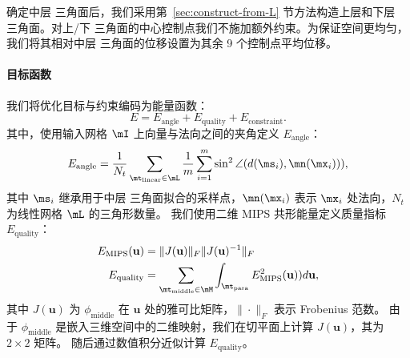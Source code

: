 %
确定中层 \Bezier 三角面后，我们采用第~\ref{sec:construct-from-L} 节方法构造上层和下层 \Bezier 三角面。对上/下 \Bezier 三角面的中心控制点我们不施加额外约束。为保证空间更均匀，我们将其相对中层 \Bezier 三角面的位移设置为其余 9 个控制点平均位移。

\paragraph{目标函数}
我们将优化目标与约束编码为能量函数：
\begin{equation}\label{equ:enenrgy}
	E = E_{\text{angle}} + E_{\text{quality}} + E_\text{constraint}.
\end{equation}
其中，使用输入网格 $\mI$ 上向量与法向之间的夹角定义 $E_{\text{angle}}$：
\begin{equation}\label{equ:angle}
 E_{\text{angle}} = \frac{1}{N_t} \sum_{\mt_{\text{linear}} \in \mL} \frac{1}{m} \sum_{i=1}^{m} \sin^2 \angle (d(\ms_i), \mn(\mx_i))),
\end{equation}
其中 $\ms_i$ 继承用于中层 \Bezier 三角面拟合的采样点，$\mn(\mx_i)$ 表示 $\mx_i$ 处法向，$N_t$ 为线性网格 $\mL$ 的三角形数量。
%
我们使用二维 MIPS 共形能量定义质量指标 $E_{\text{quality}}$：
\begin{equation}\label{equ:quality}
\begin{split}
  E_{\text{MIPS}}(\mathbf{u}) &= \|J(\mathbf{u})\|_F \|J(\mathbf{u})^{-1}\|_F \\
  E_{\text{quality}} &= \sum_{\mt_\text{middle} \in \mM}  \int_{\mt_\text{para}} E_{\text{MIPS}}^2(\mathbf{u})) d \mathbf{u},
\end{split}
\end{equation}
其中 $J(\mathbf{u})$ 为 $\phi_\text{middle}$ 在 $\mathbf{u}$ 处的雅可比矩阵，$\|\cdot\|_F$ 表示 Frobenius 范数。
由于 $\phi_\text{middle}$ 是嵌入三维空间中的二维映射，我们在切平面上计算 $J(\mathbf{u})$，其为 $2 \times 2$ 矩阵。
随后通过数值积分近似计算 $E_{\text{quality}}$。
